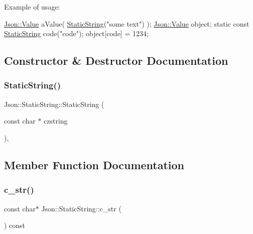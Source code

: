 Example of usage\+: 
\begin{DoxyCode}
\hyperlink{classJson_1_1Value}{Json::Value} aValue( \hyperlink{classJson_1_1StaticString_afb6baf1ec078ce76f0b0f9b39d19437f_afb6baf1ec078ce76f0b0f9b39d19437f}{StaticString}(\textcolor{stringliteral}{"some text"}) );
\hyperlink{classJson_1_1Value}{Json::Value} object;
\textcolor{keyword}{static} \textcolor{keyword}{const} \hyperlink{classJson_1_1StaticString_afb6baf1ec078ce76f0b0f9b39d19437f_afb6baf1ec078ce76f0b0f9b39d19437f}{StaticString} code(\textcolor{stringliteral}{"code"});
\textcolor{keywordtype}{object}[code] = 1234;
\end{DoxyCode}
 

\subsection{Constructor \& Destructor Documentation}
\mbox{\label{classJson_1_1StaticString_afb6baf1ec078ce76f0b0f9b39d19437f_afb6baf1ec078ce76f0b0f9b39d19437f}} 
\subsubsection{\texorpdfstring{Static\+String()}{StaticString()}}
{\footnotesize\ttfamily Json\+::\+Static\+String\+::\+Static\+String (\begin{DoxyParamCaption}\item[{const char $\ast$}]{czstring }\end{DoxyParamCaption})\hspace{0.3cm}{\ttfamily [inline]}, {\ttfamily [explicit]}}



\subsection{Member Function Documentation}
\mbox{\label{classJson_1_1StaticString_ad6be703d432d108623bb0aa06b0b90ca_ad6be703d432d108623bb0aa06b0b90ca}} 
\subsubsection{\texorpdfstring{c\+\_\+str()}{c\_str()}}
{\footnotesize\ttfamily const char$\ast$ Json\+::\+Static\+String\+::c\+\_\+str (\begin{DoxyParamCaption}{ }\end{DoxyParamCaption}) const\hspace{0.3cm}{\ttfamily [inline]}}



